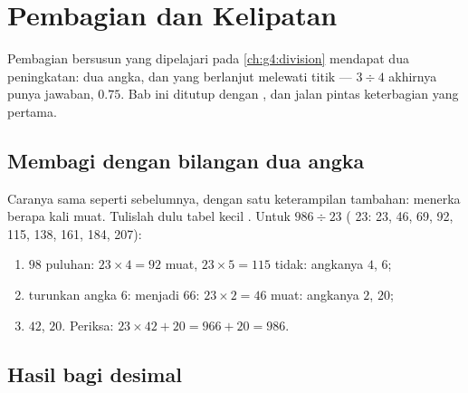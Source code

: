 \chapter{Pembagian dan Kelipatan}\label{ch:g5:division}

Pembagian bersusun yang dipelajari pada \cref{ch:g4:division}
mendapat dua peningkatan:  dua angka, dan  yang
berlanjut melewati titik --- $3 \div 4$ akhirnya punya jawaban,
$0.75$. Bab ini ditutup dengan ,  dan jalan pintas
keterbagian yang pertama.

\section{Membagi dengan bilangan dua angka}

\begin{method}\label{met:g5:division:twodigits}
Caranya sama seperti sebelumnya, dengan satu keterampilan tambahan:
menerka berapa kali  muat. Tulislah dulu tabel kecil
 . Untuk $986 \div 23$ ( 23: 23, 46, 69,
92, 115, 138, 161, 184, 207):
\begin{enumerate}
  \item $98$ puluhan: $23 \times 4 = 92$ muat, $23 \times 5 = 115$
        tidak: angkanya $4$,  $6$;
  \item turunkan angka $6$: menjadi $66$: $23 \times 2 = 46$ muat:
        angkanya $2$,  $20$;
  \item {} $42$,  $20$. Periksa:
        $23 \times 42 + 20 = 966 + 20 = 986$.
\end{enumerate}
\end{method}

\section{Hasil bagi desimal}

